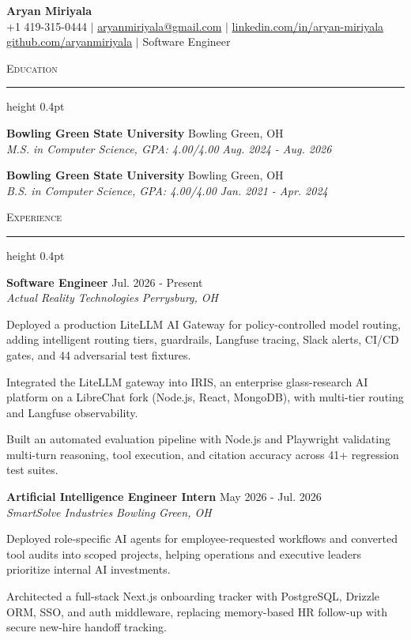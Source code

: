 \documentclass[letterpaper,11pt]{article}
\newcommand{\resumesection}[1]{%
  \par\vspace{2pt}%
  {\large\scshape #1}\par\vspace{2pt}%
  \hrule height 0.4pt\vspace{2pt}%
}
\newcommand{\resumeSubheading}[4]{
  \textbf{#1} \hfill #2\\
  \textit{#3} \hfill \textit{#4}
}
\begin{document}
\begin{center}
  {\LARGE \textbf{Aryan Miriyala}}\\[2pt]
  \small
  +1 419-315-0444 $|$ \href{mailto:aryanmiriyala@gmail.com}{aryanmiriyala@gmail.com} $|$ \href{https://www.linkedin.com/in/aryan-miriyala-7788a21b6/}{linkedin.com/in/aryan-miriyala}\\
  \href{https://github.com/aryanmiriyala}{github.com/aryanmiriyala} $|$ Software Engineer
\end{center}\vspace{-6pt}

\resumesection{Education}
\resumeSubheading
{Bowling Green State University}{Bowling Green, OH}
{M.S. in Computer Science, GPA: 4.00/4.00}{Aug. 2024 - Aug. 2026}

\resumeSubheading
{Bowling Green State University}{Bowling Green, OH}
{B.S. in Computer Science, GPA: 4.00/4.00}{Jan. 2021 - Apr. 2024}

\resumesection{Experience}
\resumeSubheading
{Software Engineer}{Jul. 2026 - Present}
{Actual Reality Technologies}{Perrysburg, OH}
\begin{tightitemize}
  \item Deployed a production LiteLLM AI Gateway for policy-controlled model routing, adding intelligent routing tiers, guardrails, Langfuse tracing, Slack alerts, CI/CD gates, and 44 adversarial test fixtures.
  \item Integrated the LiteLLM gateway into IRIS, an enterprise glass-research AI platform on a LibreChat fork (Node.js, React, MongoDB), with multi-tier routing and Langfuse observability.
  \item Built an automated evaluation pipeline with Node.js and Playwright validating multi-turn reasoning, tool execution, and citation accuracy across 41+ regression test suites.
\end{tightitemize}

\resumeSubheading
{Artificial Intelligence Engineer Intern}{May 2026 - Jul. 2026}
{SmartSolve Industries}{Bowling Green, OH}
\begin{tightitemize}
  \item Deployed role-specific AI agents for employee-requested workflows and converted tool audits into scoped projects, helping operations and executive leaders prioritize internal AI investments.
  \item Architected a full-stack Next.js onboarding tracker with PostgreSQL, Drizzle ORM, SSO, and auth middleware, replacing memory-based HR follow-up with secure new-hire handoff tracking.
\end{tightitemize}
\end{document}
